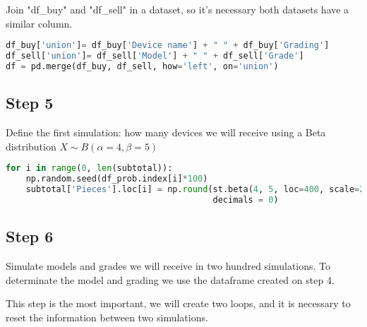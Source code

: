 \documentclass[11pt,a4paper,twocolumn]{article}
\begin{document}
Join "df\_buy" and "df\_sell" in a dataset, so it's necessary both datasets have a similar column.

\begin{lstlisting}[language=python]
df_buy['union']= df_buy['Device name'] + " " + df_buy['Grading']
df_sell['union']= df_sell['Model'] + " " + df_sell['Grade']
df = pd.merge(df_buy, df_sell, how='left', on='union')
\end{lstlisting}

\subsection{Step 5}

Define the first simulation: how many devices we will receive using a Beta distribution $X \sim B(\alpha= 4, \beta = 5)$

\begin{lstlisting}[language=python]
for i in range(0, len(subtotal)):
    np.random.seed(df_prob.index[i]*100)
    subtotal['Pieces'].loc[i] = np.round(st.beta(4, 5, loc=400, scale=200).rvs(),
                                         decimals = 0)
\end{lstlisting}

\subsection{Step 6}

Simulate models and grades we will receive in two hundred simulations. To determinate the model and grading we use the dataframe created on step 4.

This step is the most important, we will create two loops, and it is necessary to reset the information between two simulations.
\end{document}
